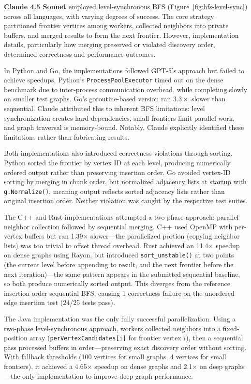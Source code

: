 \textbf{Claude 4.5 Sonnet} employed level-synchronous BFS (Figure~\ref{fig:bfs-level-sync}) across all languages, with varying degrees of success. The core strategy partitioned frontier vertices among workers, collected neighbors into private buffers, and merged results to form the next frontier. However, implementation details, particularly how merging preserved or violated discovery order, determined correctness and performance outcomes.

In Python and Go, the implementations followed GPT-5's approach but failed to achieve speedups. Python's \texttt{ProcessPoolExecutor} timed out on the dense benchmark due to inter-process communication overhead, while completing slowly on smaller test graphs. Go's goroutine-based version ran $3.3\times$
slower than sequential. Claude attributed this to inherent BFS limitations: level synchronization creates hard dependencies, small frontiers limit parallel work, and graph traversal is memory-bound. Notably, Claude explicitly identified these limitations rather than fabricating results.


Both implementations also introduced correctness violations through sorting. Python sorted the frontier by vertex ID at each level, producing numerically ordered output rather than preserving insertion order. Go avoided vertex-ID sorting by merging in chunk order, but normalized adjacency lists at startup with \texttt{g.Normalize()}, meaning output reflects sorted adjacency lists rather than original insertion order. Neither violation was caught by the respective test suites.

The C++ and Rust implementations attempted a two-phase approach: parallel neighbor collection followed by sequential merging. C++ used OpenMP with per-vertex buffers but ran 1.39$\times$ slower---the parallelized portion (copying neighbor lists) was too trivial to offset thread overhead. Rust achieved an 11.4$\times$ speedup on dense graphs using Rayon, but introduced \texttt{sort\_unstable()} at two points (the current level before appending to result, and the next frontier before the next iteration)---the same pattern appears in the submitted sequential baseline, so both produce numerically sorted output. This diverges from the reference insertion-order sequential BFS, causing 1 correctness failure on the unordered edge insertion test (24/25 tests pass).

The Java implementation was the only fully successful parallelization. Using a two-phase level-synchronous approach, workers collected neighbors into a fixed-position array (\texttt{perVertexCandidates[i]} for frontier vertex $i$), then a sequential pass processed buffers in order---preserving exact discovery order without sorting. With fallback thresholds (100 vertices for small graphs, 4 vertices for small frontiers), it achieved a 4.65$\times$ speedup on dense graphs and 2.1$\times$ on deep graphs---the only implementation to improve deep graph performance.

